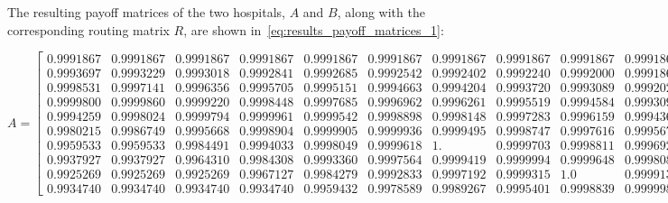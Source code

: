 The resulting payoff matrices of the two hospitals, \(A\) and \(B\), along with
the corresponding routing matrix \(R\), are shown
in~\ref{eq:results_payoff_matrices_1}:

\tiny
\begin{equation*}
    A = 
    \begin{bmatrix}
       0.9991867 & 0.9991867 & 0.9991867 & 0.9991867 & 0.9991867 &
       0.9991867 & 0.9991867 & 0.9991867 & 0.9991867 & 0.9991867 \\
       0.9993697 & 0.9993229 & 0.9993018 & 0.9992841 & 0.9992685 &
       0.9992542 & 0.9992402 & 0.9992240 & 0.9992000 & 0.9991867 \\
       0.9998531 & 0.9997141 & 0.9996356 & 0.9995705 & 0.9995151 &
       0.9994663 & 0.9994204 & 0.9993720 & 0.9993089 & 0.9992020 \\
       0.9999800 & 0.9999860 & 0.9999220 & 0.9998448 & 0.9997685 &
       0.9996962 & 0.9996261 & 0.9995519 & 0.9994584 & 0.9993094 \\
       0.9994259 & 0.9998024 & 0.9999794 & 0.9999961 & 0.9999542 &
       0.9998898 & 0.9998148 & 0.9997283 & 0.9996159 & 0.9994363  \\
       0.9980215 & 0.9986749 & 0.9995668 & 0.9998904 & 0.9999905 &
       0.9999936 & 0.9999495 & 0.9998747 & 0.9997616 & 0.9995673 \\
       0.9959533 & 0.9959533 & 0.9984491 & 0.9994033 & 0.9998049 &
       0.9999618 & 1.        & 0.9999703 & 0.9998811 & 0.9996929 \\
       0.9937927 & 0.9937927 & 0.9964310 & 0.9984308 & 0.9993360 &
       0.9997564 & 0.9999419 & 0.9999994 & 0.9999648 & 0.9998082 \\
       0.9925269 & 0.9925269 & 0.9925269 & 0.9967127 & 0.9984279 &
       0.9992833 & 0.9997192 & 0.9999315 & 1.0       & 0.9999136 \\
       0.9934740 & 0.9934740 & 0.9934740 & 0.9934740 & 0.9959432 &
       0.9978589 & 0.9989267 & 0.9995401 & 0.9998839 & 0.9999983
    \end{bmatrix}
\end{equation*}

